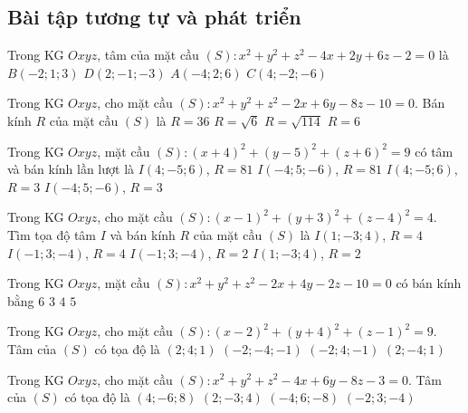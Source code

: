 \subsection{Bài tập tương tự và phát triển}
\begin{ex}%
	Trong KG $Oxyz$, tâm của mặt cầu $(S)\colon x^2+y^2+z^2-4x+2y+6z-2=0$ là
	\choice
	{$B(-2;1;3)$}
	{\True $D(2;-1;-3)$}
	{$A(-4;2;6)$}
	{$C(4;-2;-6)$}
\end{ex}
\begin{ex}%
	Trong KG $Oxyz$, cho mặt cầu $(S)\colon x^2+y^2+z^2-2x+6y-8z-10=0$. Bán kính $R$ của mặt cầu $(S)$ là
	\choice
	{$R=36$}
	{$R=\sqrt{6}$}
	{$R=\sqrt{114}$}
	{\True $R=6$}
\end{ex}
\begin{ex}%
	Trong KG $Oxyz$, mặt cầu $(S)\colon (x+4)^2+(y-5)^2+(z+6)^2=9$ có tâm và bán kính lần lượt là
	\choice
	{$I(4;-5;6)$, $R=81$}
	{$I(-4;5;-6)$, $R=81$}
	{$I(4;-5;6)$, $R=3$}
	{\True $I(-4;5;-6)$, $R=3$}
\end{ex}
\begin{ex}%
	Trong KG $Oxyz$, cho mặt cầu $(S)\colon (x-1)^2+(y+3)^2+(z-4)^2=4$. Tìm tọa độ tâm $I$ và bán kính $R$ của mặt cầu $(S)$ là
	\choice
	{$I(1;-3;4)$, $R=4$}
	{$I(-1;3;-4)$, $R=4$}
	{$I(-1;3;-4)$, $R=2$}
	{\True $I(1;-3;4)$, $R=2$}
\end{ex}
\begin{ex}%
	Trong KG $Oxyz$, mặt cầu $(S)\colon x^2+y^2+z^2-2x+4y-2z-10=0$ có bán kính bằng
	\choice
	{$6$}
	{$3$}
	{\True $4$}
	{$5$}
\end{ex}
\begin{ex}%
	Trong KG $Oxyz$, cho mặt cầu $(S)\colon (x-2)^2+(y+4)^2+(z-1)^2=9$. Tâm của $(S)$ có tọa độ là
	\choice
	{$(2;4;1)$}
	{$(-2;-4;-1)$}
	{$(-2;4;-1)$}
	{\True $(2;-4;1)$}
\end{ex}
\begin{ex}%
	Trong KG $Oxyz$, cho mặt cầu $(S)\colon x^2+y^2+z^2-4x+6y-8z-3=0$. Tâm của $(S)$ có tọa độ là
	\choice
	{$(4;-6;8)$}
	{\True $(2;-3;4)$}
	{$(-4;6;-8)$}
	{$(-2;3;-4)$}
\end{ex}
